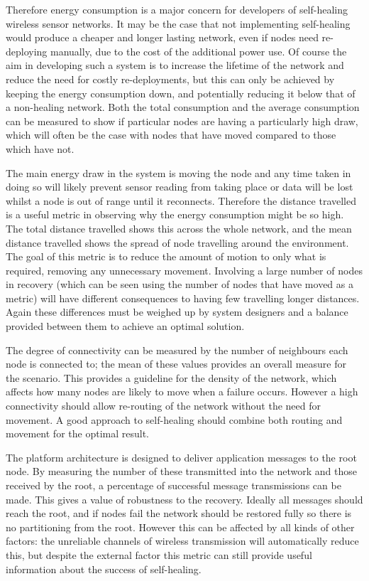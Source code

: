\documentclass[authoryearcitations]{UoYCSproject}
\begin{document}
Therefore energy consumption is a major concern for developers of self-healing wireless sensor networks. It may be the case that not implementing self-healing would produce a cheaper and longer lasting network, even if nodes need re-deploying manually, due to the cost of the additional power use. Of course the aim in developing such a system is to increase the lifetime of the network and reduce the need for costly re-deployments, but this can only be achieved by keeping the energy consumption down, and potentially reducing it below that of a non-healing network. Both the total consumption and the average consumption can be measured to show if particular nodes are having a particularly high draw, which will often be the case with nodes that have moved compared to those which have not.

The main energy draw in the system is moving the node and any time taken in doing so will likely prevent sensor reading from taking place or data will be lost whilst a node is out of range until it reconnects. Therefore the distance travelled is a useful metric in observing why the energy consumption might be so high. The total distance travelled shows this across the whole network, and the mean distance travelled shows the spread of node travelling around the environment. The goal of this metric is to reduce the amount of motion to only what is required, removing any unnecessary movement. Involving a large number of nodes in recovery (which can be seen using the number of nodes that have moved as a metric) will have different consequences to having few travelling longer distances. Again these differences must be weighed up by system designers and a balance provided between them to achieve an optimal solution.

The degree of connectivity can be measured by the number of neighbours each node is connected to; the mean of these values provides an overall measure for the scenario. This provides a guideline for the density of the network, which affects how many nodes are likely to move when a failure occurs. However a high connectivity should allow re-routing of the network without the need for movement. A good approach to self-healing should combine both routing and movement for the optimal result.

The platform architecture is designed to deliver application messages to the root node. By measuring the number of these transmitted into the network and those received by the root, a percentage of successful message transmissions can be made. This gives a value of robustness to the recovery. Ideally all messages should reach the root, and if nodes fail the network should be restored fully so there is no partitioning from the root. However this can be affected by all kinds of other factors: the unreliable channels of wireless transmission will automatically reduce this, but despite the external factor this metric can still provide useful information about the success of self-healing.
\end{document}
